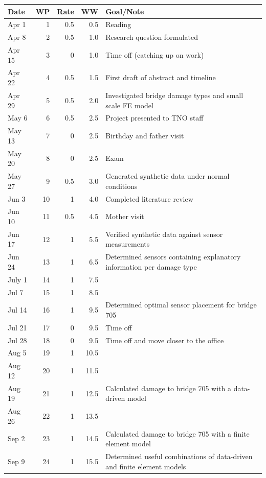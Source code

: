 \documentclass[11pt]{article}
\begin{document}
\begin{center}
\label{weekly}
\begin{tabular}{lrrrl}
Date & WP & Rate & WW & Goal/Note\\
\hline
Apr 1 & 1 & 0.5 & 0.5 & Reading\\
Apr 8 & 2 & 0.5 & 1.0 & Research question formulated\\
Apr 15 & 3 & 0 & 1.0 & \cellcolor{blue!25} Time off (catching up on work)\\
Apr 22 & 4 & 0.5 & 1.5 & First draft of abstract and timeline\\
Apr 29 & 5 & 0.5 & 2.0 & Investigated bridge damage types and small scale FE model\\
May 6 & 6 & 0.5 & 2.5 & Project presented to TNO staff\\
May 13 & 7 & 0 & 2.5 & \cellcolor{blue!25} Birthday and father visit\\
May 20 & 8 & 0 & 2.5 & \cellcolor{blue!25} Exam\\
May 27 & 9 & 0.5 & 3.0 & Generated synthetic data under normal conditions\\
Jun 3 & 10 & 1 & 4.0 & Completed literature review\\
Jun 10 & 11 & 0.5 & 4.5 & \cellcolor{blue!25} Mother visit\\
Jun 17 & 12 & 1 & 5.5 & Verified synthetic data against sensor measurements\\
Jun 24 & 13 & 1 & 6.5 & Determined sensors containing explanatory information per damage type\\
July 1 & 14 & 1 & 7.5 & \\
Jul 7 & 15 & 1 & 8.5 & \\
Jul 14 & 16 & 1 & 9.5 & Determined optimal sensor placement for bridge 705\\
Jul 21 & 17 & 0 & 9.5 & \cellcolor{blue!25} Time off\\
Jul 28 & 18 & 0 & 9.5 & \cellcolor{blue!25} Time off and move closer to the office\\
Aug 5 & 19 & 1 & 10.5 & \\
Aug 12 & 20 & 1 & 11.5 & \\
Aug 19 & 21 & 1 & 12.5 & Calculated damage to bridge 705 with a data-driven model\\
Aug 26 & 22 & 1 & 13.5 & \\
Sep 2 & 23 & 1 & 14.5 & Calculated damage to bridge 705 with a finite element model\\
Sep 9 & 24 & 1 & 15.5 & Determined useful combinations of data-driven and finite element models\\

\end{tabular}
\end{center}
\end{document}
